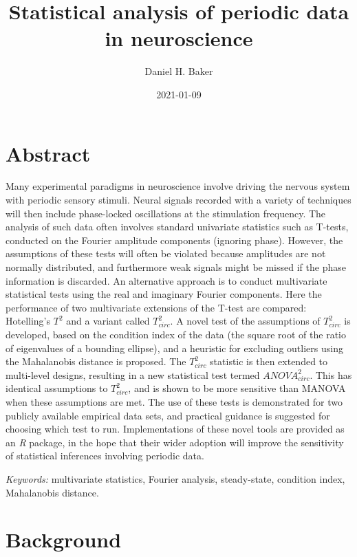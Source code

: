 \documentclass[]{article}
\title{Statistical analysis of periodic data in neuroscience}
\author{Daniel H. Baker}
\date{2021-01-09}
\begin{document}
\maketitle

\hypertarget{abstract}{%
\section{Abstract}\label{abstract}}

Many experimental paradigms in neuroscience involve driving the nervous system with periodic sensory stimuli. Neural signals recorded with a variety of techniques will then include phase-locked oscillations at the stimulation frequency. The analysis of such data often involves standard univariate statistics such as T-tests, conducted on the Fourier amplitude components (ignoring phase). However, the assumptions of these tests will often be violated because amplitudes are not normally distributed, and furthermore weak signals might be missed if the phase information is discarded. An alternative approach is to conduct multivariate statistical tests using the real and imaginary Fourier components. Here the performance of two multivariate extensions of the T-test are compared: Hotelling's \(T^2\) and a variant called \(T^2_{circ}\). A novel test of the assumptions of \(T^2_{circ}\) is developed, based on the condition index of the data (the square root of the ratio of eigenvalues of a bounding ellipse), and a heuristic for excluding outliers using the Mahalanobis distance is proposed. The \(T^2_{circ}\) statistic is then extended to multi-level designs, resulting in a new statistical test termed \(ANOVA^2_{circ}\). This has identical assumptions to \(T^2_{circ}\), and is shown to be more sensitive than MANOVA when these assumptions are met. The use of these tests is demonstrated for two publicly available empirical data sets, and practical guidance is suggested for choosing which test to run. Implementations of these novel tools are provided as an \emph{R} package, in the hope that their wider adoption will improve the sensitivity of statistical inferences involving periodic data.

\emph{Keywords:} multivariate statistics, Fourier analysis, steady-state, condition index, Mahalanobis distance.

\hypertarget{background}{%
\section{Background}\label{background}}
\end{document}
